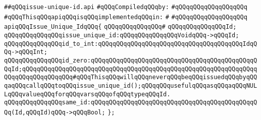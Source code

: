 \label{src/lib/src/issue-unique-id.api}
\verb|##qQQqissue-unique-id.api|\newline
\newline
\verb|#qQQqCompiledqQQqby:|\newline
\verb|#qQQqqQQqqQQqqQQqqQQq|\newline
\newline
\verb|#qQQqThisqQQqapiqQQqisqQQqimplementedqQQqin:|\newline
\verb|#|\newline
\verb|#qQQqqQQqqQQqqQQqqQQq|\newline
\newline
\verb|apiqQQqIssue_Unique_IdqQQq{|\newline
\verb|qQQqqQQqqQQqqQQq#|\newline
\verb|qQQqqQQqqQQqqQQqId;|\newline
\verb|qQQqqQQqqQQqqQQqissue_unique_id:qQQqqQQqqQQqqQQqVoidqQQq->qQQqId;|\newline
\verb|qQQqqQQqqQQqqQQqid_to_int:qQQqqQQqqQQqqQQqqQQqqQQqqQQqqQQqqQQqqQQqIdqQQq->qQQqInt;|\newline
\verb|qQQqqQQqqQQqqQQqid_zero:qQQqqQQqqQQqqQQqqQQqqQQqqQQqqQQqqQQqqQQqqQQqqQQqId;qQQqqQQqqQQqqQQqqQQqqQQqqQQqqQQqqQQqqQQqqQQqqQQqqQQqqQQqqQQqqQQqqQQqqQQqqQQqqQQqqQQq#qQQqThisqQQqwillqQQqneverqQQqbeqQQqissuedqQQqbyqQQqaqQQqcallqQQqtoqQQqissue_unique_id();qQQqqQQqusefulqQQqasqQQqaqQQqNULLqQQqvalueqQQqforqQQqvarsqQQqofqQQqtypeqQQqId.|\newline
\verb|qQQqqQQqqQQqqQQqsame_id:qQQqqQQqqQQqqQQqqQQqqQQqqQQqqQQqqQQqqQQqqQQqqQQq(Id,qQQqId)qQQq->qQQqBool;|\newline
\verb|};|\newline


